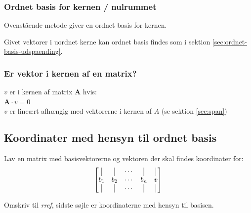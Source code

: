 \subsubsection{Ordnet basis for kernen / nulrummet}
Ovenstående metode giver en ordnet basis for kernen.

Givet vektorer i uordnet kerne kan ordnet basis findes som i sektion \ref{sec:ordnet-basis-udspaending}.

\subsubsection{Er vektor i kernen af en matrix?}
$v$ er i kernen af matrix $\mathbf{A}$ hvis: \\
\( \mathbf{A} \cdot v = 0 \) \\
\( v \) er lineært afhængig med vektorerne i kernen af \( A \) (se sektion \ref{sec:span})

\subsection{Koordinater med hensyn til ordnet basis}
Lav en matrix med basisvektorerne og vektoren der skal findes koordinater for:
\[
    \begin{bmatrix}
        \vline & \vline & \cdots & \vline & \vline \\
        b_1 & b_2 & \cdots & b_n & v \\
        \vline & \vline & \cdots & \vline & \vline \\
    \end{bmatrix}
\]

Omskriv til \emph{rref}, sidste søjle er koordinaterne med hensyn til basisen.

